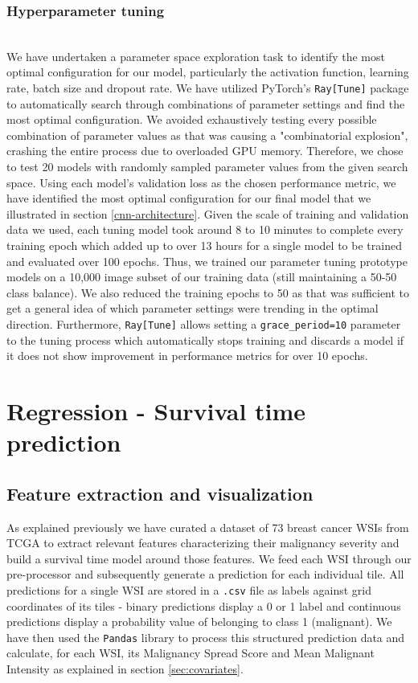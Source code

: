 \documentclass{l4proj}
\begin{document}
\subsubsection{Hyperparameter tuning}\hfill\\ \label{impl-hyperparam}
We have undertaken a parameter space exploration task to identify the most optimal configuration for our model, particularly the activation function, learning rate, batch size and dropout rate. We have utilized PyTorch's \texttt{Ray[Tune]} package to automatically search through combinations of parameter settings and find the most optimal configuration. We avoided exhaustively testing every possible combination of parameter values as that was causing a "combinatorial explosion", crashing the entire process due to overloaded GPU memory. Therefore, we chose to test 20 models with randomly sampled parameter values from the given search space. Using each model's validation loss as the chosen performance metric, we have identified the most optimal configuration  for our final model that we illustrated in section \ref{cnn-architecture}. Given the scale of training and validation data we used, each tuning model took around 8 to 10 minutes to complete every training epoch which added up to over 13 hours for a single model to be trained and evaluated over 100 epochs. Thus, we trained our parameter tuning prototype models on a 10,000 image subset of our training data (still maintaining a 50-50 class balance). We also reduced the training epochs to 50 as that was sufficient to get a general idea of which parameter settings were trending in the optimal direction. Furthermore, \texttt{Ray[Tune]} allows setting a \texttt{grace\_period=10} parameter to the tuning process which automatically stops training and discards a model if it does not show improvement in performance metrics for over 10 epochs.
 

\section{Regression - Survival time prediction}
\subsection{Feature extraction and visualization}
As explained previously we have curated a dataset of 73 breast cancer WSIs from TCGA to extract relevant features characterizing their malignancy severity and build a survival time model around those features. We feed each WSI through our pre-processor and subsequently generate a prediction for each individual tile. All predictions for a single WSI are stored in a \texttt{.csv} file as labels against  grid coordinates of its tiles - binary predictions display a 0 or 1 label and continuous predictions display a probability value of belonging to class 1 (malignant). We have then used the \texttt{Pandas} library to process this structured prediction data and calculate, for each WSI, its Malignancy Spread Score and Mean Malignant Intensity as explained in section \ref{sec:covariates}. 
\end{document}
